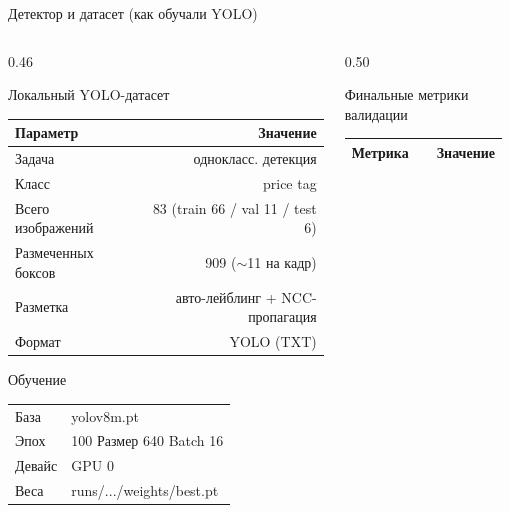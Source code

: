 \documentclass[aspectratio=169,10pt]{beamer}
\newcommand{\code}[1]{{\ttfamily\small\color{slate}#1}}
\begin{document}
\begin{frame}{Детектор и датасет (как обучали YOLO)}
  \begin{columns}[T,onlytextwidth]
    \begin{column}{0.46\textwidth}
      \begin{block}{Локальный YOLO-датасет}\footnotesize
        \setlength{\tabcolsep}{4pt}\renewcommand{\arraystretch}{1.05}
        \begin{tabular}{@{}lr@{}}\toprule
          \textbf{Параметр} & \textbf{Значение}\\ \midrule
          Задача             & однокласс. детекция\\
          Класс              & \code{price tag}\\
          Всего изображений  & 83 (train 66 / val 11 / test 6)\\
          Размеченных боксов & 909 ($\sim$11 на кадр)\\
          Разметка           & авто-лейблинг + NCC-пропагация\\
          Формат             & YOLO (TXT)\\ \bottomrule
        \end{tabular}
      \end{block}
      \vspace{0.4em}
      \begin{block}{Обучение}\footnotesize
        \setlength{\tabcolsep}{4pt}
        \begin{tabular}{@{}ll@{}}
          База & \code{yolov8m.pt}\\
          Эпох & 100 \quad Размер 640 \quad Batch 16\\
          Девайс & GPU 0\\
          Веса & \code{runs/.../weights/best.pt}\\
        \end{tabular}
      \end{block}
    \end{column}
    \begin{column}{0.50\textwidth}
      \begin{block}{Финальные метрики валидации}\vspace{0.1em}\footnotesize
        \setlength{\tabcolsep}{6pt}\renewcommand{\arraystretch}{1.15}
        \begin{tabular}{@{}llr@{}}\toprule
          \textbf{Метрика} & & \textbf{Значение}\\ \midrule

\end{tabular}
\end{block}
\end{column}
\end{columns}
\end{frame}
\end{document}
